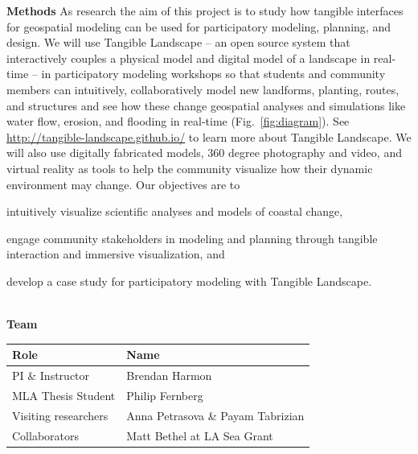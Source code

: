 \documentclass[11pt,article,oneside]{memoir}
\begin{document}
\noindent \textbf{Methods}
As research the aim of this project is to
study how tangible interfaces for geospatial modeling
can be used for participatory modeling, planning, and design.
%
We will use Tangible Landscape 
-- an open source system that interactively couples 
a physical model and digital model of a landscape in real-time --
in participatory modeling workshops
so that students and community members 
can intuitively, collaboratively model new landforms, planting, routes, and structures
and see how these change geospatial analyses and simulations 
like water flow, erosion, and flooding
in real-time (Fig.~\ref{fig:diagram}). 
% 
See \url{http://tangible-landscape.github.io/}
to learn more about Tangible Landscape.
%
We will also use digitally fabricated models, 
360 degree photography and video, 
and virtual reality as tools 
to help the community visualize 
how their dynamic environment may change. 
%
Our objectives are to
\begin{enumerate*}[label=\alph*),font=\itshape]
\item intuitively visualize scientific analyses and models of coastal change,
\item engage community stakeholders in modeling and planning 
through tangible interaction and immersive visualization,
and
\item develop a case study for participatory modeling with Tangible Landscape.
\end{enumerate*} \\

\noindent \textbf{Team}
%
\begin{table}[H]
\small
\begin{tabu} to \textwidth {lX}
\toprule
Role & Name\\
\midrule
PI \& Instructor & Brendan Harmon \\
MLA Thesis Student & Philip Fernberg \\
Visiting researchers & Anna Petrasova \& Payam Tabrizian \\
Collaborators & Matt Bethel at LA Sea Grant \\
\bottomrule
\end{tabu}
\end{table}

\end{document}
